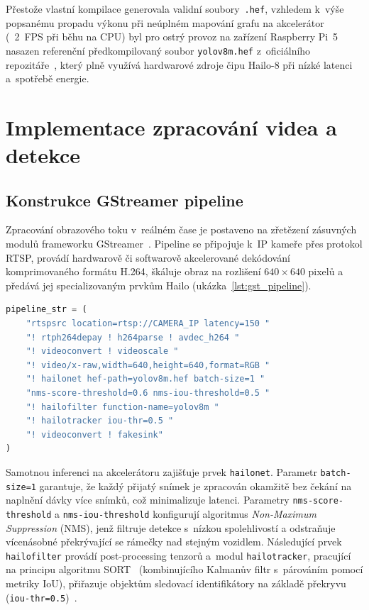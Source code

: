 Přestože vlastní kompilace generovala validní soubory~\texttt{.hef}, vzhledem k~výše popsanému propadu výkonu při neúplném mapování grafu na akcelerátor (~2~FPS při běhu na CPU) byl pro ostrý provoz na zařízení Raspberry Pi~5 nasazen referenční předkompilovaný soubor \texttt{yolov8m.hef} z~oficiálního repozitáře~\cite{hailo_rpi5_examples}, který plně využívá hardwarové zdroje čipu Hailo-8 při nízké latenci a~spotřebě energie.

\section{Implementace zpracování videa a detekce}

\subsection{Konstrukce GStreamer pipeline}
Zpracování obrazového toku v~reálném čase je postaveno na zřetězení zásuvných modulů frameworku GStreamer~\cite{gstreamer_docs}. Pipeline se připojuje k~IP kameře přes protokol RTSP, provádí hardwarově či softwarově akcelerované dekódování komprimovaného formátu H.264, škáluje obraz na rozlišení $640 \times 640$ pixelů a předává jej specializovaným prvkům Hailo (ukázka~\ref{lst:gst_pipeline}).


\begin{lstlisting}[language=Python, caption={Zjednodušená konstrukce GStreamer pipeline.}, label={lst:gst_pipeline}]
pipeline_str = (
    "rtspsrc location=rtsp://CAMERA_IP latency=150 "
    "! rtph264depay ! h264parse ! avdec_h264 "
    "! videoconvert ! videoscale "
    "! video/x-raw,width=640,height=640,format=RGB "
    "! hailonet hef-path=yolov8m.hef batch-size=1 "
    "nms-score-threshold=0.6 nms-iou-threshold=0.5 "
    "! hailofilter function-name=yolov8m "
    "! hailotracker iou-thr=0.5 "
    "! videoconvert ! fakesink"
)
\end{lstlisting}

Samotnou inferenci na akcelerátoru zajišťuje prvek \texttt{hailonet}. Parametr \texttt{batch-size=1} garantuje, že každý přijatý snímek je zpracován okamžitě bez čekání na naplnění dávky více snímků, což minimalizuje latenci. Parametry \texttt{nms-score-threshold} a \texttt{nms-iou-threshold} konfigurují algoritmus \textit{Non-Maximum Suppression} (\acs{NMS}), jenž filtruje detekce s~nízkou spolehlivostí a odstraňuje vícenásobné překrývající se rámečky nad stejným vozidlem. Následující prvek \texttt{hailofilter} provádí post-processing tenzorů a~modul \texttt{hailotracker}, pracující na principu algoritmu \acs{SORT}~\cite{SORT_original_2016} (kombinujícího Kalmanův filtr s~párováním pomocí metriky \acs{IoU}), přiřazuje objektům sledovací identifikátory na základě překryvu (\texttt{iou-thr=0.5})~\cite{tappas_user_guide_331}.

